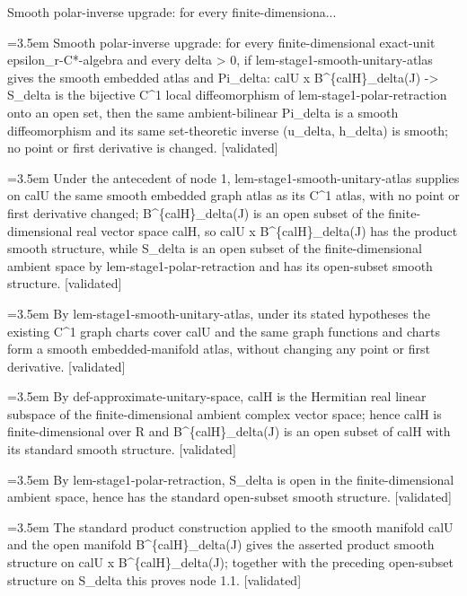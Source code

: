 \documentclass{article}
\newcommand{\step}[1]{\par\noindent\hangindent=3.5em\hangafter=1%
  \makebox[3.5em][l]{\textbf{#1.}}}
\newcommand{\steptag}[1]{\hfill{\small\textsf{[#1]}}}
\begin{document}
\begin{proofbox}{Smooth polar-inverse upgrade: for every finite-dimensiona...}
\step{1} Smooth polar-inverse upgrade: for every finite-dimensional exact-unit epsilon\_r-C*-algebra and every delta > 0, if lem-stage1-smooth-unitary-atlas gives the smooth embedded atlas and Pi\_delta: calU x B\textasciicircum{}\{calH\}\_delta(J) -> S\_delta is the bijective C\textasciicircum{}1 local diffeomorphism of lem-stage1-polar-retraction onto an open set, then the same ambient-bilinear Pi\_delta is a smooth diffeomorphism and its same set-theoretic inverse (u\_delta, h\_delta) is smooth; no point or first derivative is changed. \steptag{validated} \\[6pt]
\step{1.1} Under the antecedent of node 1, lem-stage1-smooth-unitary-atlas supplies on calU the same smooth embedded graph atlas as its C\textasciicircum{}1 atlas, with no point or first derivative changed; B\textasciicircum{}\{calH\}\_delta(J) is an open subset of the finite-dimensional real vector space calH, so calU x B\textasciicircum{}\{calH\}\_delta(J) has the product smooth structure, while S\_delta is an open subset of the finite-dimensional ambient space by lem-stage1-polar-retraction and has its open-subset smooth structure. \steptag{validated} \\[6pt]
\step{1.1.1} By lem-stage1-smooth-unitary-atlas, under its stated hypotheses the existing C\textasciicircum{}1 graph charts cover calU and the same graph functions and charts form a smooth embedded-manifold atlas, without changing any point or first derivative. \steptag{validated} \\[4pt]
\step{1.1.2} By def-approximate-unitary-space, calH is the Hermitian real linear subspace of the finite-dimensional ambient complex vector space; hence calH is finite-dimensional over R and B\textasciicircum{}\{calH\}\_delta(J) is an open subset of calH with its standard smooth structure. \steptag{validated} \\[4pt]
\step{1.1.3} By lem-stage1-polar-retraction, S\_delta is open in the finite-dimensional ambient space, hence has the standard open-subset smooth structure. \steptag{validated} \\[4pt]
\step{1.1.4} The standard product construction applied to the smooth manifold calU and the open manifold B\textasciicircum{}\{calH\}\_delta(J) gives the asserted product smooth structure on calU x B\textasciicircum{}\{calH\}\_delta(J); together with the preceding open-subset structure on S\_delta this proves node 1.1. \steptag{validated} \\[4pt]

\end{proofbox}
\end{document}
